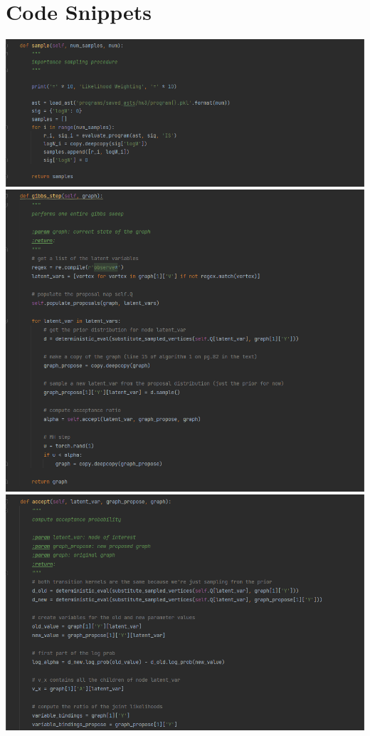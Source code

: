 \documentclass[10pt]{homeworg}
\begin{document}
\section{Code Snippets}
\begin{center}
\includegraphics[scale=0.5]{code_snippets/importance_sample.png}
\includegraphics[scale=0.5]{code_snippets/gibbs_step.png}
\includegraphics[scale=0.5]{code_snippets/accept(1).png}

\end{center}
\end{document}
